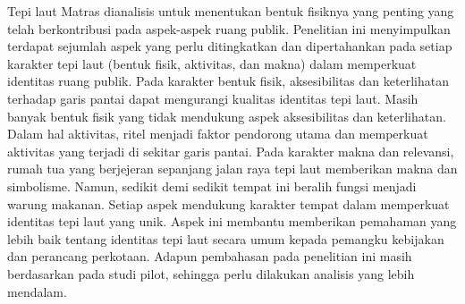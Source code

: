 \documentclass[11pt]{simart} %
\begin{document}
Tepi laut Matras dianalisis untuk menentukan bentuk fisiknya yang penting yang telah berkontribusi pada aspek-aspek ruang publik. Penelitian ini menyimpulkan terdapat sejumlah aspek yang perlu ditingkatkan dan dipertahankan pada setiap karakter tepi laut (bentuk fisik, aktivitas, dan makna) dalam memperkuat identitas ruang publik. Pada karakter bentuk fisik, aksesibilitas dan keterlihatan terhadap garis pantai dapat mengurangi kualitas identitas tepi laut. Masih banyak bentuk fisik yang tidak mendukung aspek aksesibilitas dan keterlihatan. Dalam hal aktivitas, ritel menjadi faktor pendorong utama dan memperkuat aktivitas yang terjadi di sekitar garis pantai. Pada karakter makna dan relevansi, rumah tua yang berjejeran sepanjang jalan raya tepi laut memberikan makna dan simbolisme. Namun, sedikit demi sedikit tempat ini beralih fungsi menjadi warung makanan. Setiap aspek mendukung karakter tempat dalam memperkuat identitas tepi laut yang unik. Aspek ini membantu memberikan pemahaman yang lebih baik tentang identitas tepi laut secara umum kepada pemangku kebijakan dan perancang perkotaan. Adapun pembahasan pada penelitian ini masih berdasarkan pada studi pilot, sehingga perlu dilakukan analisis yang lebih mendalam.






% 

\end{document}
